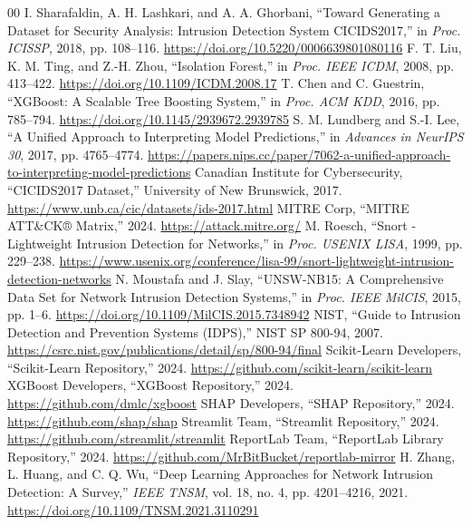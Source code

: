\documentclass[conference]{IEEEtran}
\begin{document}
\begin{thebibliography}{00}
 I. Sharafaldin, A. H. Lashkari, and A. A. Ghorbani, ``Toward Generating a Dataset for Security Analysis: Intrusion Detection System CICIDS2017,'' in \emph{Proc. ICISSP}, 2018, pp. 108--116. \url{https://doi.org/10.5220/0006639801080116}
 F. T. Liu, K. M. Ting, and Z.-H. Zhou, ``Isolation Forest,'' in \emph{Proc. IEEE ICDM}, 2008, pp. 413--422. \url{https://doi.org/10.1109/ICDM.2008.17}
 T. Chen and C. Guestrin, ``XGBoost: A Scalable Tree Boosting System,'' in \emph{Proc. ACM KDD}, 2016, pp. 785--794. \url{https://doi.org/10.1145/2939672.2939785}
 S. M. Lundberg and S.-I. Lee, ``A Unified Approach to Interpreting Model Predictions,'' in \emph{Advances in NeurIPS 30}, 2017, pp. 4765--4774. \url{https://papers.nips.cc/paper/7062-a-unified-approach-to-interpreting-model-predictions}
 Canadian Institute for Cybersecurity, ``CICIDS2017 Dataset,'' University of New Brunswick, 2017. \url{https://www.unb.ca/cic/datasets/ids-2017.html}
 MITRE Corp, ``MITRE ATT\&CK® Matrix,'' 2024. \url{https://attack.mitre.org/}
 M. Roesch, ``Snort - Lightweight Intrusion Detection for Networks,'' in \emph{Proc. USENIX LISA}, 1999, pp. 229--238. \url{https://www.usenix.org/conference/lisa-99/snort-lightweight-intrusion-detection-networks}
 N. Moustafa and J. Slay, ``UNSW-NB15: A Comprehensive Data Set for Network Intrusion Detection Systems,'' in \emph{Proc. IEEE MilCIS}, 2015, pp. 1--6. \url{https://doi.org/10.1109/MilCIS.2015.7348942}
 NIST, ``Guide to Intrusion Detection and Prevention Systems (IDPS),'' NIST SP 800-94, 2007. \url{https://csrc.nist.gov/publications/detail/sp/800-94/final}
 Scikit-Learn Developers, ``Scikit-Learn Repository,'' 2024. \url{https://github.com/scikit-learn/scikit-learn}
 XGBoost Developers, ``XGBoost Repository,'' 2024. \url{https://github.com/dmlc/xgboost}
 SHAP Developers, ``SHAP Repository,'' 2024. \url{https://github.com/shap/shap}
 Streamlit Team, ``Streamlit Repository,'' 2024. \url{https://github.com/streamlit/streamlit}
 ReportLab Team, ``ReportLab Library Repository,'' 2024. \url{https://github.com/MrBitBucket/reportlab-mirror}
 H. Zhang, L. Huang, and C. Q. Wu, ``Deep Learning Approaches for Network Intrusion Detection: A Survey,'' \emph{IEEE TNSM}, vol. 18, no. 4, pp. 4201--4216, 2021. \url{https://doi.org/10.1109/TNSM.2021.3110291}

\end{thebibliography}
\end{document}

